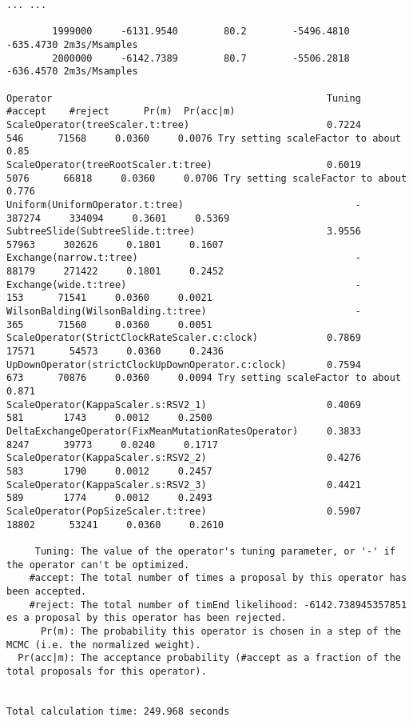 \documentclass[12pt]{article}
\begin{document}
{\begin{verbatim}
... ...

        1999000     -6131.9540        80.2        -5496.4810      -635.4730 2m3s/Msamples
        2000000     -6142.7389        80.7        -5506.2818      -636.4570 2m3s/Msamples

Operator                                                Tuning    #accept    #reject      Pr(m)  Pr(acc|m)
ScaleOperator(treeScaler.t:tree)                        0.7224        546      71568     0.0360     0.0076 Try setting scaleFactor to about 0.85
ScaleOperator(treeRootScaler.t:tree)                    0.6019       5076      66818     0.0360     0.0706 Try setting scaleFactor to about 0.776
Uniform(UniformOperator.t:tree)                              -     387274     334094     0.3601     0.5369 
SubtreeSlide(SubtreeSlide.t:tree)                       3.9556      57963     302626     0.1801     0.1607 
Exchange(narrow.t:tree)                                      -      88179     271422     0.1801     0.2452 
Exchange(wide.t:tree)                                        -        153      71541     0.0360     0.0021 
WilsonBalding(WilsonBalding.t:tree)                          -        365      71560     0.0360     0.0051 
ScaleOperator(StrictClockRateScaler.c:clock)            0.7869      17571      54573     0.0360     0.2436 
UpDownOperator(strictClockUpDownOperator.c:clock)       0.7594        673      70876     0.0360     0.0094 Try setting scaleFactor to about 0.871
ScaleOperator(KappaScaler.s:RSV2_1)                     0.4069        581       1743     0.0012     0.2500 
DeltaExchangeOperator(FixMeanMutationRatesOperator)     0.3833       8247      39773     0.0240     0.1717 
ScaleOperator(KappaScaler.s:RSV2_2)                     0.4276        583       1790     0.0012     0.2457 
ScaleOperator(KappaScaler.s:RSV2_3)                     0.4421        589       1774     0.0012     0.2493 
ScaleOperator(PopSizeScaler.t:tree)                     0.5907      18802      53241     0.0360     0.2610 

     Tuning: The value of the operator's tuning parameter, or '-' if the operator can't be optimized.
    #accept: The total number of times a proposal by this operator has been accepted.
    #reject: The total number of timEnd likelihood: -6142.738945357851
es a proposal by this operator has been rejected.
      Pr(m): The probability this operator is chosen in a step of the MCMC (i.e. the normalized weight).
  Pr(acc|m): The acceptance probability (#accept as a fraction of the total proposals for this operator).


Total calculation time: 249.968 seconds
\end{verbatim}}
\end{document}
